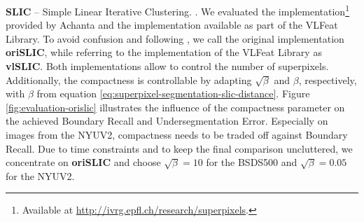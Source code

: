 \textbf{SLIC} -- Simple Linear Iterative Clustering. \cite{AchantaShajiSmithLucchiFuaSuesstrunk:2010}. We evaluated the implementation\footnote{Available at \url{http://ivrg.epfl.ch/research/superpixels}.} provided by Achanta \etal and the implementation available as part of the VLFeat Library. To avoid confusion and following \cite{NeubertProtzel:2012}, we call the original implementation \textbf{oriSLIC}, while referring to the implementation of the VLFeat Library as \textbf{vlSLIC}. Both implementations allow to control the number of superpixels. Additionally, the compactness is controllable by adapting $\sqrt{\beta}$ and $\beta$, respectively, with $\beta$ from equation \eqref{eq:superpixel-segmentation-slic-distance}. Figure \ref{fig:evaluation-orislic} illustrates the influence of the compactness parameter on the achieved Boundary Recall and Undersegmentation Error. Especially on images from the NYUV2, compactness needs to be traded off against Boundary Recall. Due to time constraints and to keep the final comparison uncluttered, we concentrate on \textbf{oriSLIC} and choose $\sqrt{\beta} = 10$ for the BSDS500 and $\sqrt{\beta} = 0.05$ for the NYUV2.

